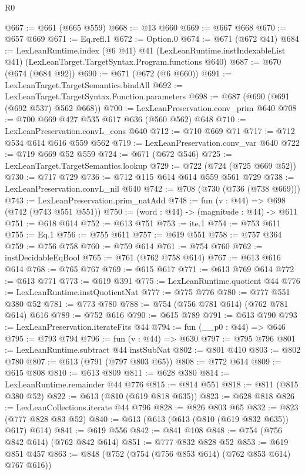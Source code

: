 \begin{lexlean}{R0}
\begin{coremodule}
@667 := @661 (@665 @559)
@668 := @13 @660
@669 := @667 @668
@670 := @657 @669
@671 := Eq.refl.{1}
@672 := Option.{0}
@674 := @671 (@672 @41)
@684 := LexLeanRuntime.index
    (@6 @41)
    @41
    (LexLeanRuntime.instIndexableList @41)
    (LexLeanTarget.TargetSyntax.Program.functions @640)
@687 := @670 (@674 (@684 @92))
@690 := @671 (@672 (@6 @660))
@691 := LexLeanTarget.TargetSemantics.bindAll
@692 := LexLeanTarget.TargetSyntax.Function.parameters
@698 := @687 (@690 (@691 (@692 @537) @562 @668))
@700 := LexLeanPreservation.conv_prim @640
@708 := @700 @669 @427 @535 @617 @636 (@560 @562) @648
@710 := LexLeanPreservation.convL_cons @640
@712 := @710 @669 @71
@717 := @712 @534 @614 @616 @559 @562
@719 := LexLeanPreservation.conv_var @640
@722 := @719 @669 @52 @559
@724 := @671 (@672 @546)
@725 := LexLeanTarget.TargetSemantics.lookup
@729 := @722 (@724 (@725 @669 @52))
@730 := @717 @729
@736 := @712 @115 @614 @614 @559 @561 @729
@738 := LexLeanPreservation.convL_nil @640
@742 := @708 (@730 (@736 (@738 @669)))
@743 := LexLeanPreservation.prim_natAdd
@748 := fun (v : @44) => @698 (@742 (@743 @551 @551))
@750 := (word : @44) -> (magnitude : @44) -> @611
@751 := @618 @614
@752 := @613 @751
@753 := ite.{1}
@754 := @753 @611
@755 := Eq.{1}
@756 := @755 @611
@757 := @619 @551
@758 := @757 @364
@759 := @756 @758
@760 := @759 @614
@761 := @754 @760
@762 := instDecidableEqBool
@765 := @761 (@762 @758 @614)
@767 := @613 @616 @614
@768 := @765 @767
@769 := @615 @617
@771 := @613 @769 @614
@772 := @613 @771
@773 := @619 @391
@775 := LexLeanRuntime.quotient @44
@776 := LexLeanRuntime.instQuotientNat
@777 := @775 @776
@780 := @777 @551 @380 @52
@781 := @773 @780
@788 := @754 (@756 @781 @614) (@762 @781 @614) @616
@789 := @752 @616
@790 := @615 @789
@791 := @613 @790
@793 := LexLeanPreservation.iterateFits @44
@794 := fun (__p0 : @44) => @646
@795 := @793 @794
@796 := fun (v : @44) => @630
@797 := @795 @796
@801 := LexLeanRuntime.subtract @44 instSubNat
@802 := @801 @410
@803 := @802 @780
@807 := @613 (@791 (@797 @803 @65))
@808 := @772 @614
@809 := @615 @808
@810 := @613 @809
@811 := @628 @380
@814 := LexLeanRuntime.remainder @44 @776
@815 := @814 @551
@818 := @811 (@815 @380 @52)
@822 := @613 (@810 (@619 @818 @635))
@823 := @628 @818
@826 := LexLeanCollections.iterate @44 @796
@828 := @826 @803 @65
@832 := @823 (@777 @828 @83 @52)
@840 := @613 (@613 (@613 (@810 (@619 @832 @635)) @617) @614)
@841 := @619 @556
@842 := @841 @108
@848 := @754 (@756 @842 @614) (@762 @842 @614)
@851 := @777 @832 @828 @52
@853 := @619 @851 @457
@863 := @848 (@752 (@754 (@756 @853 @614) (@762 @853 @614) @767 @616))

\end{coremodule}
\end{lexlean}
